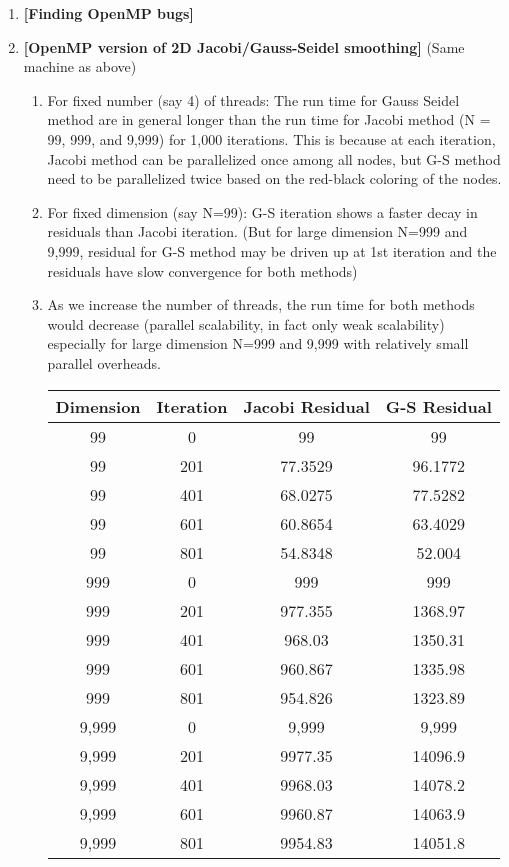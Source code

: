 \documentclass[11pt]{article}
\begin{document}
\begin{enumerate}
\begin{enumerate}
      
    \end{enumerate}
    
    
    
   \item {\bf [Finding OpenMP bugs]}
   
   \item {\bf [OpenMP version of 2D Jacobi/Gauss-Seidel smoothing]}
   (Same machine as above)
   \begin{enumerate}
            \item For fixed number (say 4) of threads: The run time for Gauss Seidel method are in general longer than the run time for Jacobi method (N = 99, 999, and 9,999) for 1,000 iterations. This is because at each iteration, Jacobi method can be parallelized once among all nodes, but G-S method need to be parallelized twice based on the red-black coloring of the nodes.  
            
            
            \item For fixed dimension (say N=99): G-S iteration shows a faster decay in residuals than Jacobi iteration. (But for large dimension N=999 and 9,999, residual for G-S method may be driven up at 1st iteration and the residuals have slow convergence for both methods)
            
            \item As we increase the number of threads, the run time for both methods would decrease (parallel scalability, in fact only weak scalability) especially for large dimension N=999 and 9,999 with relatively small parallel overheads.
            
            
            \begin{tabular}{c|c|c|c}
           Dimension & Iteration & Jacobi Residual & G-S Residual \\ \hline
            
            99 & 0 & 99 & 99  \\
            99 & 201 & 77.3529 & 96.1772  \\
            99 & 401 & 68.0275 & 77.5282  \\
            99 & 601 & 60.8654 & 63.4029  \\
            99 & 801 & 54.8348 & 52.004 \\ \hline
            999 & 0 & 999 & 999  \\
            999 & 201 & 977.355 & 1368.97  \\
            999 & 401 & 968.03 & 1350.31  \\
            999 & 601 & 960.867 & 1335.98  \\
            999 & 801 & 954.826 & 1323.89 \\ \hline
            9,999 & 0 & 9,999 & 9,999  \\
            9,999 & 201 & 9977.35 & 14096.9  \\
            9,999 & 401 & 9968.03 & 14078.2  \\
            9,999 & 601 & 9960.87 & 14063.9  \\
            9,999 & 801 & 9954.83 & 14051.8 \\ \hline
            

\end{tabular}
\end{enumerate}
\end{enumerate}
\end{document}
